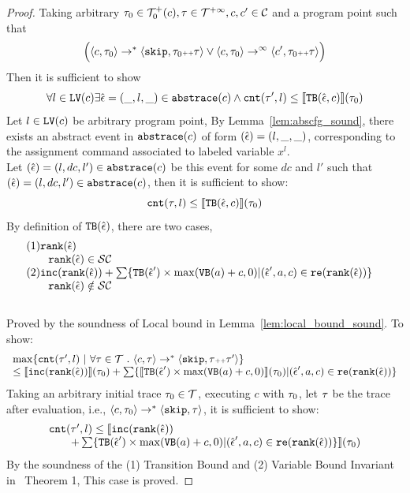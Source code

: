 \begin{proof}
  Taking arbitrary $\mathtt{\tau}_0 \in \mathcal{T}^{+}_0(c), \mathtt{\tau} \in \mathcal{T}^{+\infty}, c, c' \in \mathcal{C}$ and a program point
  such that
  \[
    \Big( \langle c, \mathtt{\tau}_0 \rangle \rightarrow^{*} \langle \mathtt{skip}, \mathtt{\tau}_0 {\scriptscriptstyle ++} \mathtt{\tau} \rangle 
    \lor  \langle c, \mathtt{\tau}_0 \rangle \rightarrow^{\infty} \langle c', \mathtt{\tau}_0 {\scriptscriptstyle ++} \mathtt{\tau} \rangle \Big)
  \]
  Then it is sufficient to show 
  \[
    \forall l \in \mathtt{LV}(c) \exists \hat{\mathtt{\epsilon}{}} = (\_, l, \_) \in \mathtt{abs}{\mathtt{trace}}(c) \land
    \mathtt{cnt}(\mathtt{\tau}', l) \leq \llbracket {\ensuremath{\mathtt{TB}}}(\hat{\mathtt{\epsilon}{}}, c) \rrbracket(\mathtt{\tau}_0)
  \]
  Let $l \in \mathtt{LV}(c)$ be arbitrary program point,
  By Lemma~\ref{lem:abscfg_sound}, there exists an abstract event in $\mathtt{abs}{\mathtt{trace}}(c)$ of form $(\hat{\mathtt{\epsilon}{}}) = (l, \_, \_)$,
  corresponding to the assignment command associated to labeled variable $x^l$. 
  \\
  Let $(\hat{\mathtt{\epsilon}{}}) = (l, dc, l') \in \mathtt{abs}{\mathtt{trace}}(c)$ be this event for some $dc$ and $l'$ such that  $(\hat{\mathtt{\epsilon}{}}) = (l, dc, l') \in \mathtt{abs}{\mathtt{trace}}(c)$,
   then it is sufficient to show:
  \[
    \mathtt{cnt}(\mathtt{\tau}, l) \leq \llbracket {\ensuremath{\mathtt{TB}}}(\hat{\mathtt{\epsilon}{}}, c) \rrbracket(\mathtt{\tau}_0)
  \]
  By definition of ${\mathtt{TB}}(\hat{\mathtt{\epsilon}{}})$, there are two cases,
  \[
 \begin{array}{ll}
  (1) \mathtt{rank}(\hat{\mathtt{\epsilon}{}}) & \\
  \qquad \mathtt{rank}(\hat{\mathtt{\epsilon}{}}) \in \mathcal{SC} \\
  (2) \mathtt{inc}(\mathtt{rank}(\hat{\mathtt{\epsilon}{}})) + 
  \sum\{{\mathtt{TB}}(\hat{\mathtt{\epsilon}{}}') \times \max({\mathtt{VB}}(a) + c, 0) | (\hat{\mathtt{\epsilon}{}}', a, c) \in \mathtt{re}(\mathtt{rank}(\hat{\mathtt{\epsilon}{}}))\} 
  & \\
  \qquad \mathtt{rank}(\hat{\mathtt{\epsilon}{}}) \notin \mathcal{SC}
\end{array}
\]
  \caseL{$\rank(\absevent) \in \constdom$}
  \\
  Proved by the soundness of Local bound in Lemma~\ref{lem:local_bound_sound}.
  \caseL{$\rank(\absevent) \notin \constdom$}
To show:
\[
  \begin{array}{l}
    \max \left\{ \counter(\vtrace',  l) ~ \middle\vert~
\forall \vtrace \in \mathcal{T} \sthat \config{{c}, \trace} \to^{*} \config{\eskip, \trace\tracecat\vtrace'} \right\} 
\\
\leq 
\econfig{\inc(\rank(\absevent))}(\trace_0) + 
\sum\{\econfig{\absclr(\absevent') \times \max(\varinvar(a) + c, 0)}(\trace_0) | (\absevent', a, c) \in \reset(\rank(\absevent))\} 
\end{array}
\]
  Taking an arbitrary initial trace
  $\mathtt{\tau}_0 \in \mathcal{T}$, 
  executing $c$ with $\mathtt{\tau}_0$, let $\mathtt{\tau}$ be the trace after evaluation, i.e., $\langle {c}, \mathtt{\tau}_0 \rangle \to^{*} \langle \mathtt{skip},\mathtt{\tau} \rangle$, it is sufficient to show:
  \[ 
    \begin{array}{l}
      \mathtt{cnt}(\mathtt{\tau}',  l) \leq 
    \llbracket \mathtt{inc}(\mathtt{rank}(\hat{\mathtt{\epsilon}{}})) 
    \\ \qquad + 
    \sum\{{\mathtt{TB}}(\hat{\mathtt{\epsilon}{}}') \times \max({\mathtt{VB}}(a) + c, 0) | (\hat{\mathtt{\epsilon}{}}', a, c) \in \mathtt{re}(\mathtt{rank}(\hat{\mathtt{\epsilon}{}}))\} \rrbracket(\mathtt{\tau}_0)
  \end{array}
  \]
%
 By the soundness of the (1) Transition Bound and (2) Variable Bound Invariant 
 in~\cite{SinnZV17} Theorem 1, 
This case is proved.
\end{proof}


%